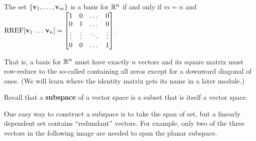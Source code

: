 \begin{applicationActivities}
\begin{fact}
  The set \(\{\mathbf v_1,\dots,\mathbf v_m\}\) is a basis for \(\mathbb{R}^n\) if and
  only if \(m=n\) and
  \(\operatorname{RREF}[\mathbf v_1\,\dots\,\mathbf v_n]=
  \begin{bmatrix}
    1&0&\dots&0\\
    0&1&\dots&0\\
    \vdots&\vdots&\ddots&\vdots\\
    0&0&\dots&1
  \end{bmatrix}
  \).

  That is, a basis for \(\mathbb{R}^n\) must have exactly \(n\) vectors and
  its square matrix must row-reduce to the so-called 
  containing all zeros except for a downward diagonal of ones.
  (We will learn where the identity matrix gets its name in a later module.)
\end{fact}

\begin{observation}
Recall that a \textbf{subspace} of a vector space is a subset that is itself a vector space.

\vspace{1em}

One easy way to construct a subspace is to take the span of set,
but a linearly dependent set contains ``redundant'' vectors. For example,
only two of the three vectors in the following image are needed to span
the planar subspace.

\begin{center}
\end{center}
\end{observation}


\end{applicationActivities}
